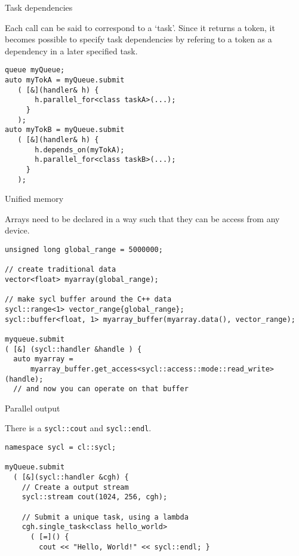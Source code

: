  {Task dependencies}

Each  call can be said to correspond to a `task'.
Since it returns a token, it becomes possible to specify
task dependencies by refering to a token as a dependency
in a later specified task.
\begin{lstlisting}
queue myQueue;
auto myTokA = myQueue.submit
   ( [&](handler& h) {
       h.parallel_for<class taskA>(...);
     }
   );
auto myTokB = myQueue.submit
   ( [&](handler& h) {
       h.depends_on(myTokA);
       h.parallel_for<class taskB>(...);
     }
   );
\end{lstlisting}


 {Unified memory}

Arrays need to be declared in a way such that they can be
access from any device.

\begin{lstlisting}
unsigned long global_range = 5000000;

// create traditional data
vector<float> myarray(global_range);

// make sycl buffer around the C++ data
sycl::range<1> vector_range{global_range};
sycl::buffer<float, 1> myarray_buffer(myarray.data(), vector_range);

myqueue.submit
( [&] (sycl::handler &handle ) {
  auto myarray =
      myarray_buffer.get_access<sycl::access::mode::read_write>(handle);
  // and now you can operate on that buffer
\end{lstlisting}

 {Parallel output}

There is a \lstinline+sycl::cout+ and \lstinline+sycl::endl+.

\begin{lstlisting}
namespace sycl = cl::sycl;

myQueue.submit
  ( [&](sycl::handler &cgh) {
    // Create a output stream
    sycl::stream cout(1024, 256, cgh);

    // Submit a unique task, using a lambda
    cgh.single_task<class hello_world>
      ( [=]() {
        cout << "Hello, World!" << sycl::endl; }
\end{lstlisting}
